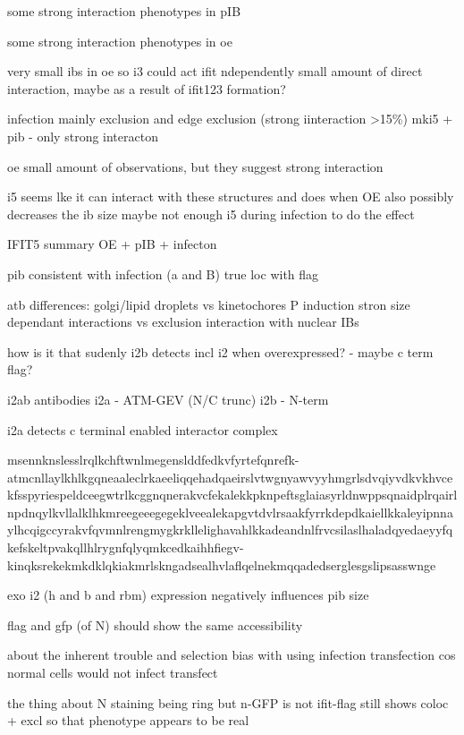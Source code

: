 some strong interaction phenotypes in pIB

some strong interaction phenotypes in oe


very small ibs in oe so i3 could act ifit ndependently
small amount of direct interaction, maybe as a result of ifit123 formation?

infection mainly exclusion and edge exclusion (strong iinteraction >15\%)
mki5 + pib - only strong interacton

oe small amount of observations, but they suggest strong interaction

i5 seems lke it can interact with these structures and does when OE
also possibly decreases the ib size
maybe not enough i5 during infection to do the effect

IFIT5 summary OE + pIB + infecton

pib consistent with infection (a and B)
true loc with flag

atb differences:
golgi/lipid droplets vs kinetochores
P induction
stron size dependant interactions vs exclusion
interaction with nuclear IBs

how is it that sudenly i2b detects incl i2 when overexpressed?
- maybe c term flag?

i2ab antibodies
i2a - ATM-GEV (N/C trunc)
i2b - N-term

i2a detects c terminal enabled interactor complex

msennknslesslrqlkchftwnlmegenslddfedkvfyrtefqnrefk-atmcnllaylkhlkgqneaaleclrkaeeliqqehadqaeirslvtwgnyawvyyhmgrlsdvqiyvdkvkhvcekfsspyriespeldceegwtrlkcggnqnerakvcfekalekkpknpeftsglaiasyrldnwppsqnaidplrqairlnpdnqylkvllalklhkmreegeeegegeklveealekapgvtdvlrsaakfyrrkdepdkaiellkkaleyipnnaylhcqigccyrakvfqvmnlrengmygkrkllelighavahlkkadeandnlfrvcsilaslhaladqyedaeyyfqkefskeltpvakqllhlrygnfqlyqmkcedkaihhfiegv-kinqksrekekmkdklqkiakmrlskngadsealhvlaflqelnekmqqadedserglesgslipsasswnge



exo i2 (h and b and rbm) expression negatively influences pib size

flag and gfp (of N) should show the same accessibility

about the inherent trouble and selection bias with using infection transfection cos normal cells would not infect transfect

the thing about N staining being ring but n-GFP is not
ifit-flag still shows coloc + excl so that phenotype appears to be real




